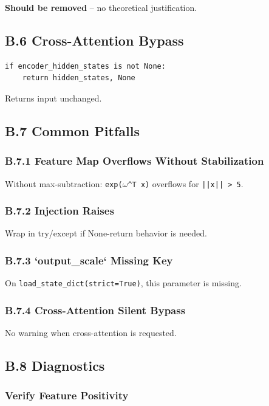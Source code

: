 \textbf{Should be removed} -- no theoretical justification.

\subsection{B.6 Cross-Attention Bypass}

\begin{lstlisting}
if encoder_hidden_states is not None:
    return hidden_states, None
\end{lstlisting}

Returns input unchanged.

\subsection{B.7 Common Pitfalls}

\subsubsection{B.7.1 Feature Map Overflows Without Stabilization}

Without max-subtraction: \texttt{exp($\omega$^T x)} overflows for \texttt{||x|| > 5}.

\subsubsection{B.7.2 Injection Raises}

Wrap in try/except if None-return behavior is needed.

\subsubsection{B.7.3 `output\_scale` Missing Key}

On \texttt{load\_state\_dict(strict=True)}, this parameter is missing.

\subsubsection{B.7.4 Cross-Attention Silent Bypass}

No warning when cross-attention is requested.

\subsection{B.8 Diagnostics}

\subsubsection{Verify Feature Positivity}

